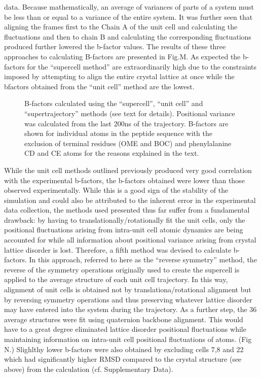 \documentclass[12pt,letterpaper]{report}
\begin{document}
\begin{enumerate}
data. Because mathematically, an average of variances of parts of a system must be less than or equal to a variance of the entire system. It was further seen that aligning the frames first to the Chain A of the unit cell and calculating the fluctuations and then to chain B and calculating the corresponding fluctuations produced further lowered the b-factor values. The results of these three approaches to calculating B-factors are presented in Fig.M. As expected the b-factors for the ``supercell method'' are extraordinarily high due to the constraints imposed by attempting to align the entire crystal lattice at once while the bfactors obtained from the ``unit cell'' method are the lowest. 

	\begin{figure}[H]
	\centering
	\setcounter{subfigure}{0}
	\caption{B-factors calculated using the ``supercell'', ``unit cell'' and ``supertrajectory'' methods (see text for details). Positional variance was calculated from the last 200ns of the trajectory. B-factors are shown for individual atoms in the peptide sequence with the exclusion of terminal residues (OME and BOC) and phenylalanine CD and CE atoms for the reasons explained in the text.}
	\label{bfactorsA}
	\end{figure}


While the unit cell methods outlined previously produced very good correlation with the experimental b-factors, the b-factors obtained were lower than those observed experimentally. While this is a good sign of the stability of the simulation and could also be attributed to the inherent error in the experimental data collection, the methods used presented thus far suffer from a fundamental drawback: by having to translationally/rotationally fit the unit cells, only the positional fluctuations arising from intra-unit cell atomic dynamics are being accounted for while all information about positional variance arising from crystal lattice disorder is lost. Therefore, a fifth method was devised to calculate b-factors. In this approach, referred to here as the ``reverse symmetry'' method, the reverse of the symmetry operations originally used to create the supercell is applied to the average structure of each unit cell trajectory. In this way, alignment of unit cells is obtained not by translationa/rotational alignment but by reversing symmetry operations and thus preserving whatever lattice disorder may have entered into the system during the trajectory. As a further step, the 36 average structures were fit using quaternion backbone alignment. This would have to a great degree eliminated lattice disorder positional fluctuations while maintaining information on intra-unit cell positional fluctuations of atoms. (Fig N.) Slighlthy lower b-factors were also obtained by excluding cells 7,8 and 22 which had significantly higher RMSD compared to the crystal structure (see above) from the calculation (cf. Supplementary Data).


\end{enumerate}
\end{document}
